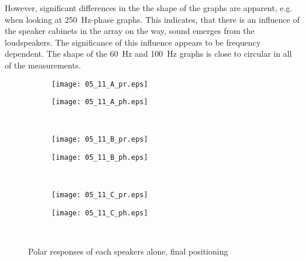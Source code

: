 However, significant differences in the the shape of the graphs are apparent, e.g. when looking at \SI{250}{\hertz}-phase graphs. This indicates, that there is an influence of the speaker cabinets in the array on the way, sound emerges from the loudspeakers. The significance of this influence appears to be frequency dependent. The shape of the \SI{60}{\hertz} and \SI{100}{\hertz} graphs is close to circular in all of the measurements.

\begin{figure}[h]
\begin{subfigure}[c]{0.5\textwidth}
\texttt{[image: 05\_11\_A\_pr.eps]}
\label{fig:05_11_A_pr}
\end{subfigure}
\begin{subfigure}[c]{0.5\textwidth}
\texttt{[image: 05\_11\_A\_ph.eps]}
\label{fig:05_11_A_ph}
\end{subfigure}\\
\hspace{0.1\textheight}
\begin{subfigure}[c]{0.5\textwidth}
\texttt{[image: 05\_11\_B\_pr.eps]}
\label{fig:05_11_B_pr}
\end{subfigure}
\begin{subfigure}[c]{0.5\textwidth}
\texttt{[image: 05\_11\_B\_ph.eps]}
\label{fig:05_11_B_ph}
\end{subfigure}\\
\hspace{0.1\textheight}
\begin{subfigure}[c]{0.5\textwidth}
\texttt{[image: 05\_11\_C\_pr.eps]}
\label{fig:05_11_C_pr}
\end{subfigure}
\begin{subfigure}[c]{0.5\textwidth}
\texttt{[image: 05\_11\_C\_ph.eps]}
\label{fig:05_11_C_ph}
\end{subfigure}\\
\caption{Polar responses of each speakers alone, final positioning}  
\label{fig:05_11_single}
\end{figure}


